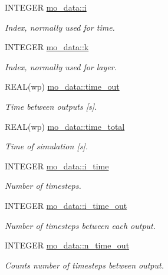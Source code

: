 \begin{DoxyCompactItemize}
INTEGER \hyperlink{namespacemo__data_ad15359b125bff66cb0f739e0eb5b01d4}{mo\_\-data::i}
\begin{DoxyCompactList}\small\item\em Index, normally used for time. \item\end{DoxyCompactList}\item 
INTEGER \hyperlink{namespacemo__data_afe6f17e4b469a746c68d9233d35ad11f}{mo\_\-data::k}
\begin{DoxyCompactList}\small\item\em Index, normally used for layer. \item\end{DoxyCompactList}\item 
REAL(wp) \hyperlink{namespacemo__data_a98be98c2961c1d3ccfdf5a52682b78d1}{mo\_\-data::time\_\-out}
\begin{DoxyCompactList}\small\item\em Time between outputs \mbox{[}s\mbox{]}. \item\end{DoxyCompactList}\item 
REAL(wp) \hyperlink{namespacemo__data_a6a4393d34e8f95d252b2bca2d30d5af3}{mo\_\-data::time\_\-total}
\begin{DoxyCompactList}\small\item\em Time of simulation \mbox{[}s\mbox{]}. \item\end{DoxyCompactList}\item 
INTEGER \hyperlink{namespacemo__data_abca60ca0614b7061c6ef58e6e6daa60f}{mo\_\-data::i\_\-time}
\begin{DoxyCompactList}\small\item\em Number of timesteps. \item\end{DoxyCompactList}\item 
INTEGER \hyperlink{namespacemo__data_aa28d05f6fec3b61de0fbd7b4aa67f6ae}{mo\_\-data::i\_\-time\_\-out}
\begin{DoxyCompactList}\small\item\em Number of timesteps between each output. \item\end{DoxyCompactList}\item 
INTEGER \hyperlink{namespacemo__data_a39a97d63744c18a6e9f3524d2dcc4154}{mo\_\-data::n\_\-time\_\-out}
\begin{DoxyCompactList}\small\item\em Counts number of timesteps between output. \item\end{DoxyCompactList}\item 

\end{DoxyCompactItemize}
